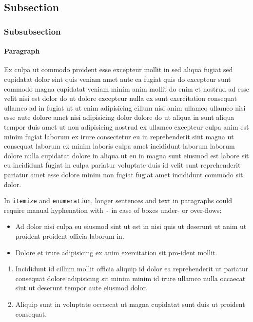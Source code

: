 \documentclass{melba}
\begin{document}
	\subsection{Subsection}
		\subsubsection{Subsubsection}
			\paragraph{Paragraph} Ex culpa ut commodo proident esse excepteur mollit in sed aliqua fugiat sed cupidatat dolor sint quis veniam amet aute ea fugiat quis do excepteur sunt commodo magna cupidatat veniam minim anim mollit do enim et nostrud ad esse velit nisi est dolor do ut dolore excepteur nulla ex sunt exercitation consequat ullamco ad in fugiat ut ut enim adipisicing cillum nisi anim ullamco ullamco nisi esse aute dolore amet nisi adipisicing dolor dolore do ut aliqua in sunt aliqua tempor duis amet ut non adipisicing nostrud ex ullamco excepteur culpa anim est minim fugiat laborum ex irure consectetur eu in reprehenderit sint magna ut consequat laborum ex minim laboris culpa amet incididunt laborum laborum dolore nulla cupidatat dolore in aliqua ut eu in magna sunt eiusmod est labore sit eu incididunt fugiat in culpa pariatur voluptate duis id velit sunt reprehenderit pariatur amet esse dolore minim non fugiat fugiat amet incididunt commodo sit dolor.

			In \verb|itemize| and \verb|enumeration|, longer sentences and text in paragraphs could require manual hyphenation with \verb|-| in case of boxes under- or over-flows:
			\begin{itemize}
				\item Ad dolor nisi culpa eu eiusmod sint ut est in nisi quis ut deserunt ut anim ut proident proident officia laborum in.
				\item Dolore et irure adipisicing ex anim exercitation sit pro-ident mollit.
			\end{itemize}

			\begin{enumerate}
				\item Incididunt id cillum mollit officia aliquip id dolor ea reprehenderit ut pariatur consequat dolore adipisicing sit minim minim id irure ullamco nulla occaecat sint ut deserunt tempor aute eiusmod dolor.
				\item Aliquip sunt in voluptate occaecat ut magna cupidatat sunt duis ut proident consequat.
			\end{enumerate}
\end{document}
